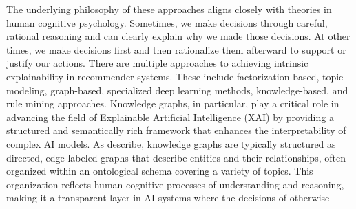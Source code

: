 The underlying philosophy of these approaches aligns closely with theories in
human cognitive psychology. Sometimes, we make decisions through careful, rational
reasoning and can clearly explain why we made those decisions. At other times, we
make decisions first and then rationalize them afterward to support or justify our
actions. There are multiple approaches to achieving intrinsic
explainability in recommender systems. These include factorization-based, topic modeling,
graph-based, specialized deep learning methods, knowledge-based, and rule mining
approaches. Knowledge graphs, in particular, play a critical role in advancing
the field of Explainable Artificial Intelligence (XAI) by providing a structured
and semantically rich framework that enhances the interpretability of complex AI
models. As \textcite{tiddi_knowledge_2022} describe, knowledge graphs are typically
structured as directed, edge-labeled graphs that describe entities and their relationships,
often organized within an ontological schema covering a variety of topics. This organization
reflects human cognitive processes of understanding and reasoning, making it a
transparent layer in AI systems where the decisions of otherwise


